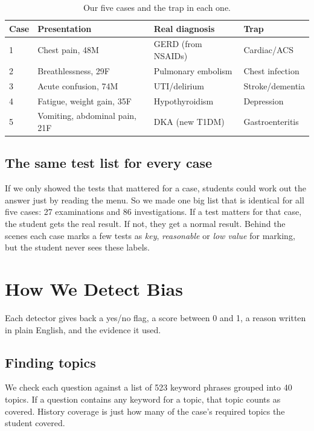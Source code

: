 \documentclass[conference]{IEEEtran}
\begin{document}
\begin{table}[t]
\caption{Our five cases and the trap in each one.}
\label{tab:cases}
\centering
\small
\begin{tabular}{@{}p{0.7cm}p{2.4cm}p{2.0cm}p{1.7cm}@{}}
\toprule
\textbf{Case} & \textbf{Presentation} & \textbf{Real diagnosis} & \textbf{Trap} \\
\midrule
1 & Chest pain, 48M & GERD (from NSAIDs) & Cardiac/ACS \\
2 & Breathlessness, 29F & Pulmonary embolism & Chest infection \\
3 & Acute confusion, 74M & UTI/delirium & Stroke/dementia \\
4 & Fatigue, weight gain, 35F & Hypothyroidism & Depression \\
5 & Vomiting, abdominal pain, 21F & DKA (new T1DM) & Gastroenteritis \\
\bottomrule
\end{tabular}
\end{table}

\subsection{The same test list for every case}
\label{sec:universal}
If we only showed the tests that mattered for a case, students could work out the
answer just by reading the menu. So we made one big list that is identical for
all five cases: 27 examinations and 86 investigations. If a test matters for that
case, the student gets the real result. If not, they get a normal result. Behind
the scenes each case marks a few tests as \emph{key}, \emph{reasonable} or
\emph{low value} for marking, but the student never sees these labels.

\section{How We Detect Bias}
\label{sec:bias}
Each detector gives back a yes/no flag, a score between 0 and 1, a reason written
in plain English, and the evidence it used.

\subsection{Finding topics}
\label{sec:topic}
We check each question against a list of 523 keyword phrases grouped into 40
topics. If a question contains any keyword for a topic, that topic counts as
covered. History coverage is just how many of the case's required topics the
student covered.
\end{document}
